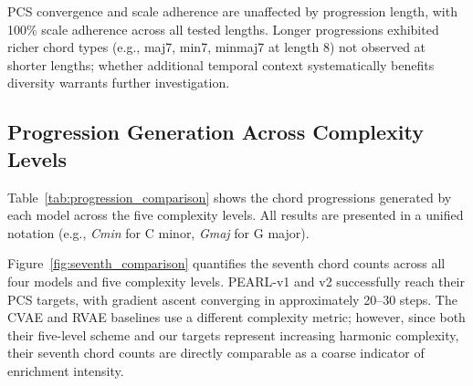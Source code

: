 \documentclass[conference]{IEEEtran}
\begin{document}
PCS convergence and scale adherence are unaffected by progression length, with 100\% scale adherence across all tested lengths. Longer progressions exhibited richer chord types (e.g., maj7, min7, minmaj7 at length 8) not observed at shorter lengths; whether additional temporal context systematically benefits diversity warrants further investigation.

\subsection{Progression Generation Across Complexity Levels}

Table~\ref{tab:progression_comparison} shows the chord progressions generated by each model across the five complexity levels. All results are presented in a unified notation (e.g., \textit{Cmin} for C minor, \textit{Gmaj} for G major).

\begin{table}[h!]
\centering
\caption{Generated chord progressions across five complexity levels. Input: \textit{Cmin -- Gmaj -- Cmin -- Fmin -- Cmin}.}
\label{tab:progression_comparison}
\end{table}

Figure~\ref{fig:seventh_comparison} quantifies the seventh chord counts across all four models and five complexity levels. PEARL-v1 and v2 successfully reach their PCS targets, with gradient ascent converging in approximately 20--30 steps. The CVAE and RVAE baselines use a different complexity metric; however, since both their five-level scheme and our targets represent increasing harmonic complexity, their seventh chord counts are directly comparable as a coarse indicator of enrichment intensity.
\end{document}
